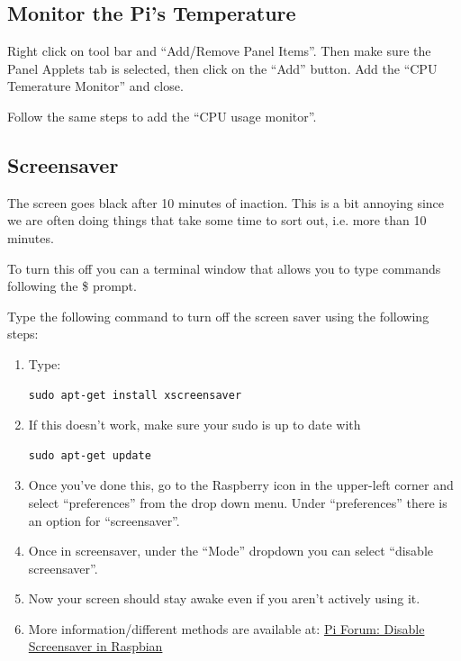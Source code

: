 \documentclass{article}\usepackage[]{graphicx}\usepackage[]{color}
\begin{document}
\subsection{Monitor the Pi's Temperature}

Right click on tool bar and ``Add/Remove Panel Items''. Then make sure the Panel Applets tab is selected, then click on the ``Add'' button. 
Add the ``CPU Temerature Monitor'' and close.

Follow the same steps to add the ``CPU usage monitor''.

\subsection{Screensaver}

The screen goes black after 10 minutes of inaction. This is a bit annoying since we are often doing things that take some time to sort out, i.e. more than 10 minutes. 

To turn this off you can a terminal window that allows you to type commands following the \$ prompt. 

Type the following command to turn off the screen saver using the following steps: 

\begin{enumerate}

\item Type: 

\begin{lstlisting}
sudo apt-get install xscreensaver
\end{lstlisting}

\item If this doesn't work, make sure your sudo is up to date with 
\begin{lstlisting}
sudo apt-get update
\end{lstlisting}

\item Once you've done this, go to the Raspberry icon in the upper-left corner and select ``preferences'' from the drop down menu.  Under ``preferences'' there is an option for ``screensaver''.

\item Once in screensaver, under the ``Mode'' dropdown you can select ``disable screensaver''.

\item Now your screen should stay awake even if you aren't actively using it.

\item More information/different methods are available at: \href{https://www.raspberrypi.org/forums/viewtopic.php?f=91&t=57552}{Pi Forum:  Disable Screensaver in Raspbian}

\end{enumerate}
\end{document}
